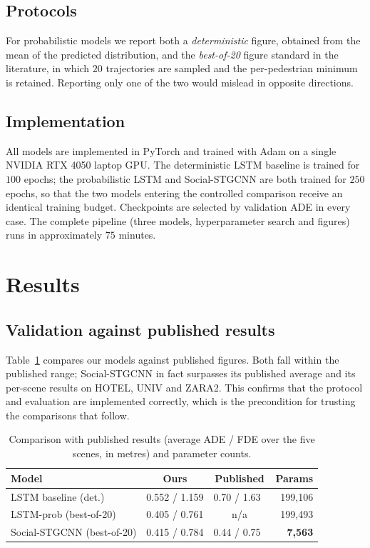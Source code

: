 \documentclass[conference]{IEEEtran}
\begin{document}
\subsection{Protocols}

For probabilistic models we report both a \emph{deterministic} figure, obtained from the
mean of the predicted distribution, and the \emph{best-of-20} figure standard in the
literature, in which $20$ trajectories are sampled and the per-pedestrian minimum is
retained. Reporting only one of the two would mislead in opposite directions.

\subsection{Implementation}

All models are implemented in PyTorch and trained with Adam on a single NVIDIA RTX 4050
laptop GPU. The deterministic LSTM baseline is trained for $100$ epochs; the probabilistic LSTM and
Social-STGCNN are both trained for $250$ epochs, so that the two models entering the
controlled comparison receive an identical training budget. Checkpoints are selected by
validation ADE in every case. The complete pipeline (three models, hyperparameter search
and figures) runs in approximately $75$ minutes.

\section{Results}

\subsection{Validation against published results}

Table~\ref{tab:published} compares our models against published figures. Both fall within
the published range; Social-STGCNN in fact surpasses its published average and its
per-scene results on HOTEL, UNIV and ZARA2. This confirms that the protocol and evaluation
are implemented correctly, which is the precondition for trusting the comparisons that
follow.

\begin{table}[t]
\caption{Comparison with published results (average ADE / FDE over the five scenes, in
metres) and parameter counts.}
\label{tab:published}
\centering
\small
\begin{tabular}{lccr}
\toprule
Model & Ours & Published & Params \\
\midrule
LSTM baseline (det.)        & 0.552 / 1.159 & 0.70 / 1.63~\cite{gupta2018social} & 199{,}106 \\
LSTM-prob (best-of-20)      & 0.405 / 0.761 & n/a                                & 199{,}493 \\
Social-STGCNN (best-of-20)  & 0.415 / 0.784 & 0.44 / 0.75~\cite{mohamed2020social} & \textbf{7{,}563} \\
\bottomrule
\end{tabular}
\end{table}
\end{document}
